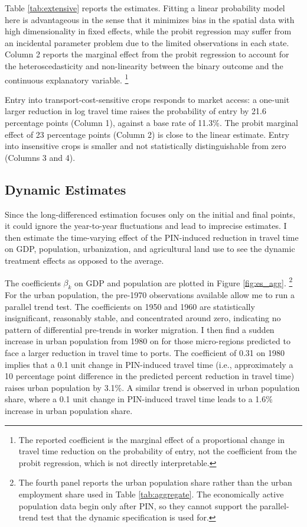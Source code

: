 \documentclass[11pt]{article}
\begin{document}
Table \ref{tab:extensive} reports the estimates. Fitting a linear probability model here is advantageous in the sense that it minimizes bias in the spatial data with high dimensionality in fixed effects, while the probit regression may suffer from an incidental parameter problem due to the limited observations in each state. Column 2 reports the marginal effect from the probit regression to account for the heteroscedasticity and non-linearity between the binary outcome and the continuous explanatory variable. \footnote{The reported coefficient is the marginal effect of a proportional change in travel time reduction on the probability of entry, not the coefficient from the probit regression, which is not directly interpretable.}

Entry into transport-cost-sensitive crops responds to market access: a one-unit larger reduction in log travel time raises the probability of entry by 21.6 percentage points (Column 1), against a base rate of 11.3\%. The probit marginal effect of 23 percentage points (Column 2) is close to the linear estimate. Entry into insensitive crops is smaller and not statistically distinguishable from zero (Columns 3 and 4).

\subsection{Dynamic Estimates}
\label{sec:dynamic}
Since the long-differenced estimation focuses only on the initial and final points, it could ignore the year-to-year fluctuations and lead to imprecise estimates. I then estimate the time-varying effect of the PIN-induced reduction in travel time on GDP, population, urbanization, and agricultural land use to see the dynamic treatment effects as opposed to the average.

The coefficients $\beta_k$ on GDP and population are plotted in Figure \ref{fig:es_agg}. \footnote{The fourth panel reports the urban population share rather than the urban employment share used in Table \ref{tab:aggregate}. The economically active population data begin only after PIN, so they cannot support the parallel-trend test that the dynamic specification is used for.} For the urban population, the pre-1970 observations available allow me to run a parallel trend test. The coefficients on 1950 and 1960 are statistically insignificant, reasonably stable, and concentrated around zero, indicating no pattern of differential pre-trends in worker migration. I then find a sudden increase in urban population from 1980 on for those micro-regions predicted to face a larger reduction in travel time to ports. The coefficient of 0.31 on 1980 implies that a 0.1 unit change in PIN-induced travel time (i.e., approximately a 10 percentage point difference in the predicted percent reduction in travel time) raises urban population by 3.1\%. A similar trend is observed in urban population share, where a 0.1 unit change in PIN-induced travel time leads to a 1.6\% increase in urban population share. 
\end{document}
